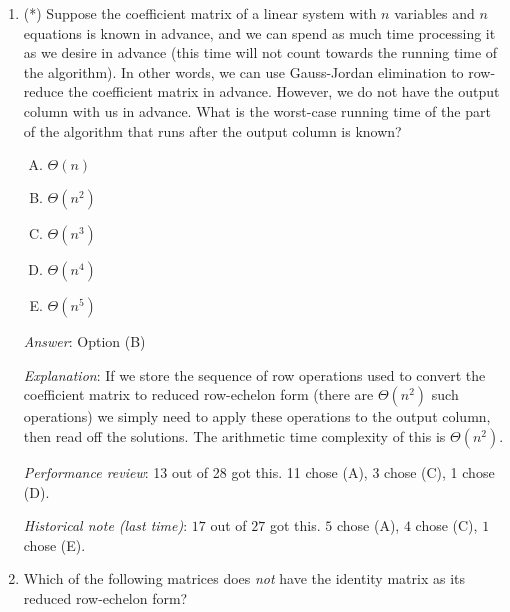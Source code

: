 \documentclass[10pt]{amsart}
\begin{document}
\begin{enumerate}
  {\em Answer}: Option (B)

  {\em Explanation}: We can reuse the matrix space to keep rewriting
  over existing entries. We need some additional workspace for working
  memory, but this is quite small relative to the size of the matrix,
  and does not affect the order estimate.

  More in the lecture notes on Gauss-Jordan elimination.

  {\em Performance review}: 25 out of 28 got this. 2 chose (D), 1
  chose (C).

  {\em Historical note (last time)}: $26$ out of $27$ got this. $1$ chose (A).

\item (*) Suppose the coefficient matrix of a linear system with $n$
  variables and $n$ equations is known in advance, and we can spend as
  much time processing it as we desire in advance (this time will not
  count towards the running time of the algorithm). In other words, we
  can use Gauss-Jordan elimination to row-reduce the coefficient
  matrix in advance. However, we do not have the output column with us
  in advance. What is the worst-case running time of the part of the
  algorithm that runs after the output column is known?

  \begin{enumerate}[(A)]
  \item $\Theta(n)$
  \item $\Theta(n^2)$
  \item $\Theta(n^3)$
  \item $\Theta(n^4)$
  \item $\Theta(n^5)$
  \end{enumerate}

  {\em Answer}: Option (B)

  {\em Explanation}: If we store the sequence of row operations used
  to convert the coefficient matrix to reduced row-echelon form (there
  are $\Theta(n^2)$ such operations) we simply need to apply these
  operations to the output column, then read off the solutions. The
  arithmetic time complexity of this is $\Theta(n^2)$.

  {\em Performance review}: 13 out of 28 got this. 11 chose (A), 3
  chose (C), 1 chose (D).

  {\em Historical note (last time)}: $17$ out of $27$ got this. $5$ chose (A),
  $4$ chose (C), $1$ chose (E).

\item Which of the following matrices does {\em not} have the identity
  matrix as its reduced row-echelon form?


\end{enumerate}
\end{document}
